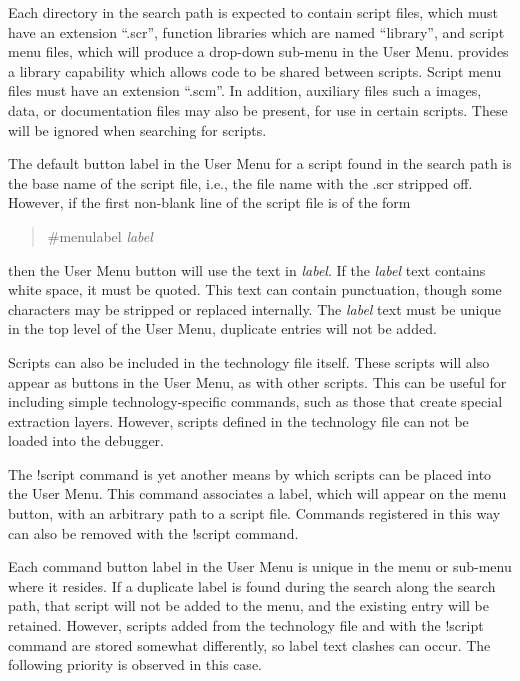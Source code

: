 Each directory in the search path is expected to contain script files,
which must have an extension ``{\vt .scr}'', function libraries which
are named ``{\vt library}'', and script menu files, which will produce
a drop-down sub-menu in the {\cb User Menu}.  {\Xic} provides a library
capability which allows code to be shared between scripts.  Script
menu files must have an extension ``{\vt .scm}''.  In addition,
auxiliary files such a images, data, or documentation files may also
be present, for use in certain scripts.  These will be ignored when
searching for scripts.

The default button label in the {\cb User Menu} for a script found in
the search path is the base name of the script file, i.e., the file
name with the {\vt .scr} stripped off.  However, if the first
non-blank line of the script file is of the form

\begin{quote}
{\vt \#menulabel} {\it label}
\end{quote}

then the {\cb User Menu} button will use the text in {\it label}.  If
the {\it label} text contains white space, it must be quoted.  This
text can contain punctuation, though some characters may be stripped
or replaced internally.  The {\it label} text must be unique in the
top level of the {\cb User Menu}, duplicate entries will not be added.

Scripts can also be included in the technology file itself.  These
scripts will also appear as buttons in the {\cb User Menu}, as with
other scripts.  This can be useful for including simple
technology-specific commands, such as those that create special
extraction layers.  However, scripts defined in the technology file
can not be loaded into the debugger.

The {\cb !script} command is yet another means by which scripts can be
placed into the {\cb User Menu}.  This command associates a label,
which will appear on the menu button, with an arbitrary path to a
script file.  Commands registered in this way can also be removed with
the {\cb !script} command.

Each command button label in the {\cb User Menu} is unique in the menu
or sub-menu where it resides.  If a duplicate label is found during
the search along the search path, that script will not be added to the
menu, and the existing entry will be retained.  However, scripts added
from the technology file and with the {\cb !script} command are stored
somewhat differently, so label text clashes can occur.  The following
priority is observed in this case.

